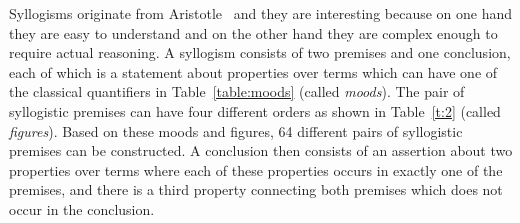 \documentclass[12pt]{article}
\begin{document}
Syllogisms originate from Aristotle~\cite{aristotle} and
they are interesting because on one hand they are easy to understand and on the other hand
they are complex enough to require actual reasoning. 
A syllogism consists of two
premises and one conclusion,
each of which is a statement about properties over terms which can have one of the classical quantifiers in Table~\ref{table:moods} (called \emph{moods}). The pair of syllogistic premises can have four different orders as shown in Table~\ref{t:2} (called \emph{figures}). Based on these moods and figures, 64 different pairs of syllogistic premises can be constructed.
A conclusion then consists of an assertion about two properties over terms where each of these properties occurs in exactly one of the premises, and there is a third property connecting both premises which does not occur in the conclusion.
\end{document}
